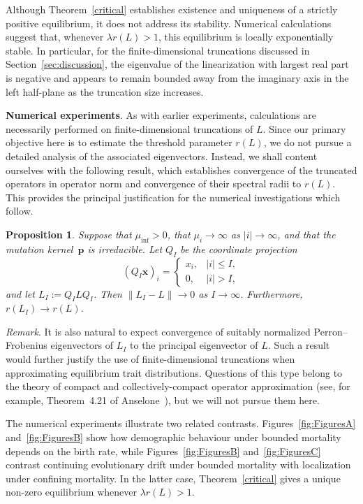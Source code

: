 \documentclass[12pt]{article}
\newtheorem{proposition}{Proposition}
\newcommand{\muinf}{\ensuremath{\mu_{\inf}}}
\newcommand{\bp}{\boldsymbol{p}}
\newcommand{\bx}{\boldsymbol{x}}
\begin{document}
Although Theorem~\ref{critical} establishes existence and uniqueness of
a strictly positive equilibrium, it does not address its stability.
Numerical calculations suggest that, whenever $\lambda r(L)>1$, this
equilibrium is locally exponentially stable. In particular, for the
finite-dimensional truncations discussed in
Section~\ref{sec:discussion}, the eigenvalue of the linearization with
largest real part is negative and appears to remain bounded away from
the imaginary axis in the left half-plane as the truncation size
increases.

\medskip
\noindent
{\bf Numerical experiments}.
As with earlier experiments, calculations are necessarily performed on
finite-dimensional truncations of $L$. Since our primary objective here
is to estimate the threshold parameter $r(L)$, we do not pursue a
detailed analysis of the associated eigenvectors. Instead, we shall
content ourselves with the following result, which establishes
convergence of the truncated operators in operator norm and convergence
of their spectral radii to $r(L)$. This provides the principal
justification for the numerical investigations which follow.

\begin{proposition}
\label{truncation}
Suppose that $\muinf>0$, that $\mu_i\to\infty$ as
$|i|\to\infty$, and that the mutation kernel~$\bp$ is irreducible.
Let $Q_I$ be the coordinate projection
$$
(Q_I\bx)_i=
\begin{cases}
x_i, & |i|\leq I,\\
0, & |i|>I,
\end{cases}
$$
and let $L_I:=Q_ILQ_I$. Then $\|L_I-L\|\to 0$ as $I\to\infty$.
Furthermore, $r(L_I)\to r(L)$.
\end{proposition}


\noindent
\emph{Remark}.
It is also natural to expect convergence of suitably
normalized Perron--Frobenius eigenvectors of $L_I$ to the principal
eigenvector of $L$. Such a result would further justify the use of
finite-dimensional truncations when approximating equilibrium trait
distributions. Questions of this type belong to the theory of compact
and collectively-compact operator approximation (see, for example,
Theorem~4.21 of Anselone~\cite{Anselone71}), but we will not pursue them here.

\medskip
The numerical experiments illustrate two related contrasts.
Figures~\ref{fig:FiguresA} and~\ref{fig:FiguresB} show how
demographic behaviour under bounded mortality depends on the birth rate,
while Figures~\ref{fig:FiguresB} and~\ref{fig:FiguresC} contrast
continuing evolutionary drift under bounded mortality with localization
under confining mortality. In the latter case, Theorem~\ref{critical}
gives a unique non-zero equilibrium whenever $\lambda r(L)>1$.
\end{document}
